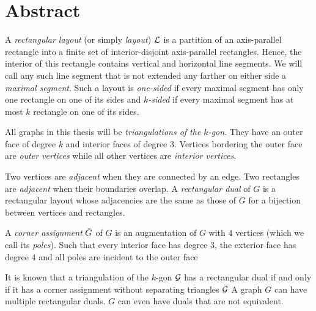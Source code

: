 
\section*{Abstract}
\thispagestyle{plain}

  A  \emph{rectangular layout} (or simply \emph{layout}) $\mathcal{L}$ is a partition of an axis-parallel rectangle into a finite set of interior-disjoint axis-parallel rectangles. Hence, the interior of this rectangle contains vertical and horizontal line segments. We will call any such line segment that is not extended any farther on either side a \emph{maximal segment}. Such a layout is \emph{one-sided} if every maximal segment has only one rectangle on one of its sides and \emph{$k$-sided} if every maximal segment has at most $k$ rectangle on one of its sides.

  All graphs in this thesis will be \emph{triangulations of the $k$-gon}. They have an outer face of degree $k$ and interior faces of degree $3$.
  Vertices bordering the outer face are \emph{outer vertices} while all other vertices are \emph{interior vertices}.

  Two vertices are \emph{adjacent} when they are connected by an edge. Two rectangles are \emph{adjacent} when their boundaries overlap. A \emph{rectangular dual} of $G$ is a rectangular layout whose adjacencies are the same as those of $G$ for a bijection between vertices and rectangles.

  A \emph{corner assignment} $\bar{G}$ of $G$ is an augmentation of $G$ with $4$ vertices (which we call its \emph{poles}). Such that every interior face has degree $3$, the exterior face has degree $4$ and all poles are incident to the outer face


  It is known that a triangulation of the $k$-gon $\mathcal{G}$ has a rectangular dual if and only if it has a corner assignment without separating triangles $\bar{\mathcal{G}}$
  A graph $G$ can have multiple rectangular duals. $G$ can even have duals that are not equivalent.


